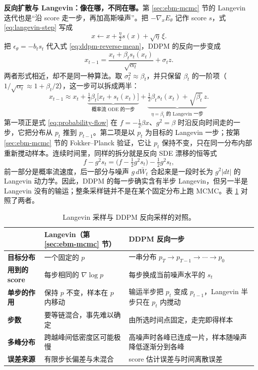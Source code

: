 \textbf{反向扩散与 Langevin：像在哪，不同在哪。}第 \ref{sec:ebm-mcmc} 节的 Langevin 迭代也是“沿 score 走一步，再加高斯噪声”。把 \(-\nabla_xE_\theta\) 记作 score \(s\)，式 \eqref{eq:langevin-step} 写成
\begin{equation}
 x\leftarrow x+\tfrac{\eta}{2}s(x)+\sqrt\eta\,\xi.
\end{equation}
把 \(\epsilon_\theta=-b_ts_t\) 代入式 \eqref{eq:ddpm-reverse-mean}，DDPM 的反向一步变成
\begin{equation}
 x_{t-1}=\frac{x_t+\beta_ts_t(x_t)}{\sqrt{\alpha_t}}+\sigma_tz.
\end{equation}
两者形式相近，却不是同一种算法。取 \(\sigma_t^2\approx\beta_t\)，并只保留 \(\beta_t\) 的一阶项（\(1/\sqrt{\alpha_t}\approx1+\beta_t/2\)），这一步可以拆成两半：
\begin{equation}
 x_{t-1}\approx x_t
 +\underbrace{\tfrac12\beta_t\bigl[x_t+s_t(x_t)\bigr]}_{\text{概率流 ODE 的一步}}
 +\underbrace{\tfrac12\beta_ts_t(x_t)+\sqrt{\beta_t}\,z}_{\eta=\beta_t\text{ 的 Langevin 一步}}.
 \label{eq:ddpm-langevin-split}
\end{equation}
第一项正是式 \eqref{eq:probability-flow} 在 \(f=-\tfrac12\beta x\)、\(g^2=\beta\) 时沿反向时间走的一步，它把分布从 \(p_t\) 推到 \(p_{t-1}\)。第二项是以 \(p_t\) 为目标的 Langevin 一步；按第 \ref{sec:ebm-mcmc} 节的 Fokker--Planck 验证，它让 \(p_t\) 保持不变，只在同一分布内部重新搅动样本。连续时间里，同样的拆分就是反向 SDE 漂移的恒等式
\begin{equation}
 f-g^2s_t=\bigl(f-\tfrac12g^2s_t\bigr)-\tfrac12g^2s_t,
\end{equation}
前一部分是概率流速度，后一部分与噪声 \(g\,d\bar W_t\) 合起来是一段时长为 \(g^2|dt|\) 的 Langevin 动力学。因此，DDPM 的每一步确实含有半步 Langevin，但另一半是 Langevin 没有的输运；整条采样链并不是在某个固定分布上跑 MCMC。表 \ref{tab:langevin-vs-diffusion} 对照了两者。

\begin{table}[H]
\centering\small
\begin{tabularx}{\textwidth}{>{\bfseries}p{20mm} X X}
\toprule
 & Langevin（第 \ref{sec:ebm-mcmc} 节） & DDPM 反向一步\\
\midrule
目标分布 & 一个固定的 \(p\) & 一串分布 \(p_T\to p_{T-1}\to\cdots\to p_0\)\\
用到的 score & 每步相同的 \(\nabla\log p\) & 每步换成当前噪声水平的 \(s_t\)\\
单步的作用 & 保持 \(p\) 不变，样本在 \(p\) 内移动 & 输运半步把 \(p_t\) 变成 \(p_{t-1}\)，Langevin 半步只在 \(p_t\) 内搅动\\
步数 & 要等链混合，事先难以确定 & 由所选时间点固定，走完即得样本\\
多峰分布 & 跨越峰间低密度区可能极慢 & 高噪声时各峰已连成一片，样本随噪声降低逐渐分到各峰\\
误差来源 & 有限步长偏差与未混合 & score 估计误差与时间离散误差\\
\bottomrule
\end{tabularx}
\caption{Langevin 采样与 DDPM 反向采样的对照。}
\label{tab:langevin-vs-diffusion}
\end{table}

